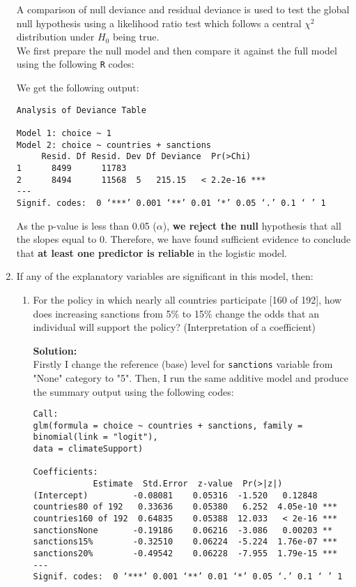 \documentclass[12pt,letterpaper]{article}
\begin{document}
\begin{enumerate}
A comparison of null deviance and residual deviance is used to test the global null hypothesis using a likelihood ratio test which follows a central $\chi^2$ distribution under $H_0$ being true.\\
We first prepare the null model and then compare it against the full model using the following \texttt{R} codes:


We get the following output:
\begin{Verbatim}
Analysis of Deviance Table

Model 1: choice ~ 1
Model 2: choice ~ countries + sanctions
     Resid. Df Resid. Dev Df Deviance  Pr(>Chi)    
1      8499      11783                          
2      8494      11568  5   215.15   < 2.2e-16 ***
---
Signif. codes:  0 ‘***’ 0.001 ‘**’ 0.01 ‘*’ 0.05 ‘.’ 0.1 ‘ ’ 1
\end{Verbatim}
As the p-value is less than 0.05 ($\alpha$), \textbf{we reject the null} hypothesis that all the slopes equal to 0. Therefore, we have found sufficient evidence to conclude that \textbf{at least one predictor is reliable} in the logistic model.

	\item
	If any of the explanatory variables are significant in this model, then:
	\begin{enumerate}
		\item
		For the policy in which nearly all countries participate [160 of 192], how does increasing sanctions from 5\% to 15\% change the odds that an individual will support the policy? (Interpretation of a coefficient)

\pagebreak
\noindent\textbf{Solution:\\}
Firstly I change the reference (base) level for \texttt{sanctions} variable from "None" category to "5". Then, I run the same additive model and produce the summary output using the following codes:


\begin{Verbatim}
Call:
glm(formula = choice ~ countries + sanctions, family = binomial(link = "logit"), 
data = climateSupport)

Coefficients:
		    Estimate  Std.Error  z-value  Pr(>|z|)    
(Intercept)         -0.08081    0.05316  -1.520   0.12848    
countries80 of 192   0.33636    0.05380   6.252  4.05e-10 ***
countries160 of 192  0.64835    0.05388  12.033   < 2e-16 ***
sanctionsNone       -0.19186    0.06216  -3.086   0.00203 ** 
sanctions15%        -0.32510    0.06224  -5.224  1.76e-07 ***
sanctions20%        -0.49542    0.06228  -7.955  1.79e-15 ***
---
Signif. codes:  0 ‘***’ 0.001 ‘**’ 0.01 ‘*’ 0.05 ‘.’ 0.1 ‘ ’ 1


\end{Verbatim}
\end{enumerate}
\end{enumerate}
\end{document}
